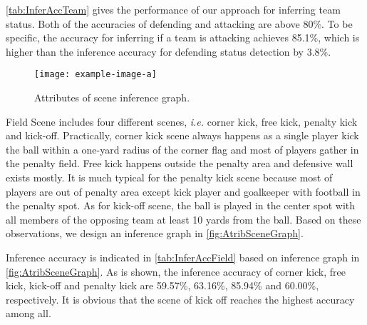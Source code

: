 \autoref{tab:InferAccTeam} gives the performance of our approach for inferring team status. Both of the accuracies of defending and attacking are above 80\%. To be specific, the accuracy for inferring if a team is attacking achieves 85.1\%, which is higher than the inference accuracy for defending status detection by 3.8\%.



\begin{figure}[!bth]
	\centering	
	\begin{minipage}[b]{\linewidth}
		\centerline{\texttt{[image: example-image-a]}}
	\end{minipage}\hfill
	\caption{Attributes of scene inference graph.}
	\label{fig:AtribSceneGraph}
\end{figure}

Field Scene includes four different scenes, \textit{i.e.} corner kick, free kick, penalty kick and kick-off. Practically, corner kick scene always happens as a single player kick the ball within a one-yard radius of the corner flag and most of players gather in the penalty field. Free kick happens outside the penalty area and defensive wall exists mostly. It is much typical for the penalty kick scene because most of players are out of penalty area except kick player and goalkeeper with football in the penalty spot. As for kick-off scene, the ball is played in the center spot with all members of the opposing team at least 10 yards from the ball. Based on these observations, we design an inference graph in \autoref{fig:AtribSceneGraph}.


Inference accuracy is indicated in \autoref{tab:InferAccField} based on inference graph in \autoref{fig:AtribSceneGraph}. As is shown, the inference accuracy of corner kick, free kick, kick-off and penalty kick are 59.57\%, 63.16\%, 85.94\% and 60.00\%, respectively. It is obvious that the scene of kick off reaches the highest accuracy among all.
 

